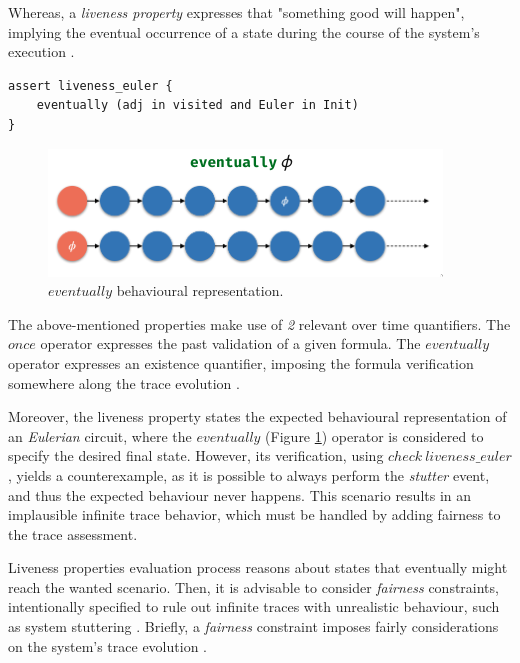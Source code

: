 Whereas, a \textit{liveness property} expresses that "something good will happen", implying the eventual occurrence of a state during the course of the system's execution \cite{lamport1977proving}.

\begin{lstlisting}[title={\textit{Liveness Property}: Eventually the graph will represent an \textit{Eulerian} circuit.}, otherkeywords = {assert, eventually, in, and}]
assert liveness_euler {
    eventually (adj in visited and Euler in Init)
} 
\end{lstlisting}

\begin{figure}[H]
    \centering
    \includegraphics[width=0.6\linewidth]{img/alloy_eventually.png}
    \caption{$eventually$ behavioural representation.}
    \label{fig:alloy-eventually}
\end{figure}

The above-mentioned properties make use of \textit{2} relevant over time quantifiers. The $once$ operator expresses the past validation of a given formula. The $eventually$ operator expresses an existence quantifier, imposing the formula verification somewhere along the trace evolution \cite{alloy-docs}.

Moreover, the liveness property states the expected behavioural representation of an \textit{Eulerian} circuit, where the $eventually$ (Figure \ref{fig:alloy-eventually}) operator is considered to specify the desired final state. However, its verification, using $check\ liveness\_euler$, yields a counterexample, as it is possible to always perform the \textit{stutter} event, and thus the expected behaviour never happens. This scenario results in an implausible infinite trace behavior, which must be handled by adding fairness to the trace assessment. 

Liveness properties evaluation process reasons about states that eventually might reach the wanted scenario. Then, it is advisable to consider \textit{fairness} constraints, intentionally specified to rule out infinite traces with unrealistic behaviour, such as system stuttering \cite{baier2008principles}. Briefly, a \textit{fairness} constraint imposes fairly considerations on the system's trace evolution \cite{wahlfairness}.


